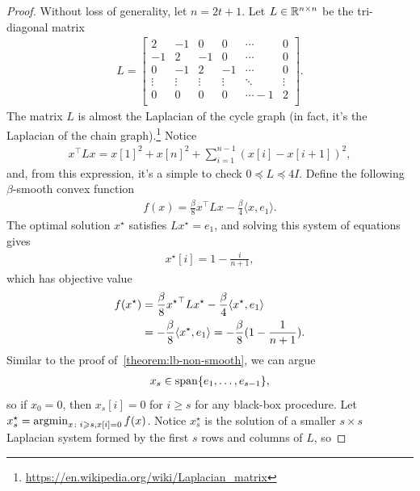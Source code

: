 \begin{proof}
Without loss of generality, let $n = 2t+1$.
Let $L \in \mathbb{R}^{n \times n}$ be the tri-diagonal matrix
\begin{align*}
    L =
    \begin{bmatrix}
        2 & -1 & 0 & 0 & \cdots & 0 \\
        -1 & 2 & -1 & 0 & \cdots & 0 \\
        0 & -1 & 2 & -1  & \cdots & 0 \\
        \vdots & \vdots & \vdots & \vdots & \ddots & \vdots \\
        0 & 0 & 0 & 0 & \cdots -1 & 2  \\
    \end{bmatrix}.
\end{align*}
The matrix $L$ is almost the Laplacian of the cycle
graph (in fact, it's the Laplacian of the chain graph).\footnote{\url{https://en.wikipedia.org/wiki/Laplacian_matrix}}
Notice
\begin{align*}
    x^\top L x = x[1]^2 + x[n]^2 + \sum_{i=1}^{n-1} (x[i] - x[i+1])^2,
\end{align*}
and, from this expression, it's a simple to check
$0 \preceq L \preceq 4I$.
Define the following $\beta$-smooth convex function
\begin{align*}
    f(x) = \frac{\beta}{8} x^\top L x - \frac{\beta}{4}\langle x, e_1 \rangle.
\end{align*}
The optimal solution $x^\star$ satisfies $Lx^\star = e_1$, and solving this 
system of equations gives
\begin{align*}
    x^\star[i] = 1 - \frac{i}{n+1},
\end{align*}
which has objective value
\begin{align*}
    f(x^\star)
    &=  \frac{\beta}{8} {x^\star}^\top L x^\star - \frac{\beta}{4}\langle
    x^\star, e_1 \rangle \\
    &= -\frac{\beta}{8} \langle x^\star, e_1 \rangle
    = -\frac{\beta}{8} (1 - \frac{1}{n+1} ).
\end{align*}
Similar to the proof of~\eqref{theorem:lb-non-smooth}, we can argue
\begin{align*}
    x_s \in \mathop{\rm span}\{e_1, \dots, e_{s-1}\},
\end{align*}
so if $x_0 = 0$, then $x_s[i] = 0$ for $i \geq s$ for any black-box procedure.
Let $x_s^\star = \mathop{\rm argmin}_{x \colon i\geqslant s, x[i] = 0} f(x)$. Notice $x_s^\star$
is the solution of a smaller $s \times s$ Laplacian system formed by the
first $s$ rows and columns of $L$, so

\end{proof}
